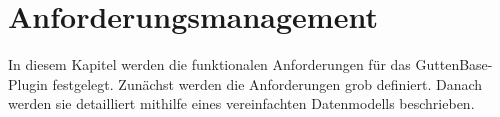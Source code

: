 \chapter{Anforderungsmanagement}
\label{sec:analyse}
In diesem Kapitel werden die funktionalen Anforderungen für das GuttenBase-Plugin festgelegt. Zunächst werden die Anforderungen grob definiert. Danach werden sie detailliert mithilfe eines vereinfachten Datenmodells beschrieben.

